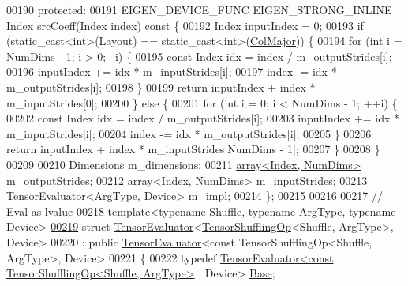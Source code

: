 \begin{DoxyCode}
00190  \textcolor{keyword}{protected}:
00191   EIGEN\_DEVICE\_FUNC EIGEN\_STRONG\_INLINE Index srcCoeff(Index index)\textcolor{keyword}{ const }\{
00192     Index inputIndex = 0;
00193     \textcolor{keywordflow}{if} (static\_cast<int>(Layout) == static\_cast<int>(\hyperlink{group__enums_ggaacded1a18ae58b0f554751f6cdf9eb13a0cbd4bdd0abcfc0224c5fcb5e4f6669a}{ColMajor})) \{
00194       \textcolor{keywordflow}{for} (\textcolor{keywordtype}{int} i = NumDims - 1; i > 0; --i) \{
00195         \textcolor{keyword}{const} Index idx = index / m\_outputStrides[i];
00196         inputIndex += idx * m\_inputStrides[i];
00197         index -= idx * m\_outputStrides[i];
00198       \}
00199       \textcolor{keywordflow}{return} inputIndex + index * m\_inputStrides[0];
00200     \} \textcolor{keywordflow}{else} \{
00201       \textcolor{keywordflow}{for} (\textcolor{keywordtype}{int} i = 0; i < NumDims - 1; ++i) \{
00202         \textcolor{keyword}{const} Index idx = index / m\_outputStrides[i];
00203         inputIndex += idx * m\_inputStrides[i];
00204         index -= idx * m\_outputStrides[i];
00205       \}
00206       \textcolor{keywordflow}{return} inputIndex + index * m\_inputStrides[NumDims - 1];
00207     \}
00208   \}
00209 
00210   Dimensions m\_dimensions;
00211   \hyperlink{class_eigen_1_1array}{array<Index, NumDims>} m\_outputStrides;
00212   \hyperlink{class_eigen_1_1array}{array<Index, NumDims>} m\_inputStrides;
00213   \hyperlink{struct_eigen_1_1_tensor_evaluator}{TensorEvaluator<ArgType, Device>} m\_impl;
00214 \};
00215 
00216 
00217 \textcolor{comment}{// Eval as lvalue}
00218 \textcolor{keyword}{template}<\textcolor{keyword}{typename} Shuffle, \textcolor{keyword}{typename} ArgType, \textcolor{keyword}{typename} Device>
\hyperlink{struct_eigen_1_1_tensor_evaluator_3_01_tensor_shuffling_op_3_01_shuffle_00_01_arg_type_01_4_00_01_device_01_4}{00219} \textcolor{keyword}{struct }\hyperlink{struct_eigen_1_1_tensor_evaluator}{TensorEvaluator}<\hyperlink{class_eigen_1_1_tensor_shuffling_op}{TensorShufflingOp}<Shuffle, ArgType>, Device>
00220     : \textcolor{keyword}{public} \hyperlink{struct_eigen_1_1_tensor_evaluator}{TensorEvaluator}<const TensorShufflingOp<Shuffle, ArgType>, Device>
00221 \{
00222   \textcolor{keyword}{typedef} \hyperlink{struct_eigen_1_1_tensor_evaluator}{TensorEvaluator<const TensorShufflingOp<Shuffle, ArgType>}
      , Device> \hyperlink{struct_eigen_1_1_tensor_evaluator_3_01const_01_tensor_shuffling_op_3_01_shuffle_00_01_arg_type_01_4_00_01_device_01_4}{Base};

\end{DoxyCode}
